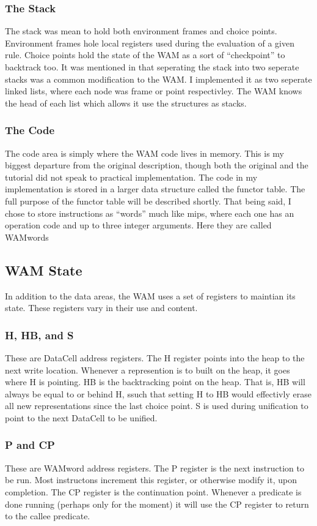\documentclass{article}
\begin{document}
\subsubsection{The Stack}
The stack was mean to hold both environment frames and choice points. Environment frames hole local registers used during the evaluation of a given rule. Choice points hold the state of the WAM as a sort of ``checkpoint'' to backtrack too. It was mentioned in \cite{} that seperating the stack into two seperate stacks was a common modification to the WAM. I implemented it as two seperate linked lists, where each node was frame or point respectivley. The WAM knows the head of each list which allows it use the structures as stacks. 

\subsubsection{The Code}
The code area is simply where the WAM code lives in memory. This is my biggest departure from the original description, though both the original and the tutorial did not speak to practical implementation. The code in my implementation is stored in a larger data structure called the functor table. The full purpose of the functor table will be described shortly. That being said, I chose to store instructions as ``words'' much like mips, where each one has an operation code and up to three integer arguments. Here they are called WAMwords

\subsection{WAM State}
In addition to the data areas, the WAM uses a set of registers to maintian its state. These registers vary in their use and content. 

\subsubsection{H, HB, and S}
These are DataCell address registers. The H register points into the heap to the next write location. Whenever a represention is to built on the heap, it goes where H is pointing. HB is the backtracking point on the heap. That is, HB will always be equal to or behind H, ssuch that setting H to HB would effectivly erase all new representations since the last choice point. S is used during unification to point to the next DataCell to be unified. 

\subsubsection{P and CP}
These are WAMword address registers. The P register is the next instruction to be run. Most instructons increment this register, or otherwise modify it, upon completion. The CP register is the continuation point. Whenever a predicate is done running (perhaps only for the moment) it will use the CP register to return to the callee predicate.
\end{document}
